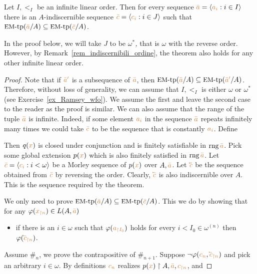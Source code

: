 \begin{void}\label{thm_EM}
  Let $I,<_I$ be an infinite linear order.
  Then for every sequence ${\color{brown}\bar a}=\langle{\color{brown}a_i}:i\in I\rangle$ there is an $A$-indiscernible sequence ${\color{brown}\bar c}=\langle{\color{brown}c_i}:i\in J\rangle$ such that $\mbox{{\small EM}-tp}({\color{brown}\bar a}/A)\subseteq\mbox{{\small EM}-tp}({\color{brown}\bar c}/A)$.
\end{void}

In the proof below, we will take $J$ to be \emph{$\omega^*$,} that is $\omega$ with the reverse order. 
However, by Remark~\ref{rem_indiscernibili_ordine}, the theorem also holds for any other infinite linear order.

\begin{proof}
  Note that if ${\color{brown}\bar a'}$ is a subsequence of ${\color{brown}\bar a}$, then $\mbox{{\small EM}-tp}({\color{brown}\bar a}/A)\subseteq\mbox{{\small EM}-tp}({\color{brown}\bar a'}/A)$.
  Therefore, without loss of generality, we can assume that $I,<_I$ is either $\omega$ or $\omega^*$ (see Exercise~\ref{ex_Ramsey_wfo}).
  We assume the first and leave the second case to the reader as the proof is similar.
  We can also assume that the range of the tuple ${\color{brown}\bar a}$ is infinite.
  Indeed, if some element ${\color{brown} a_i}$ in the sequence ${\color{brown}\bar a}$ repeats infinitely many times we could take ${\color{brown}\bar c}$ to be the sequence that is constantly ${\color{brown} a_i}$.
  Define


Then $q({\color{brown} x})$ is closed under conjunction and is finitely satisfiable in $\mathop{\rm rng} {\color{brown}\bar a}$. 
Pick some global extension $p({\color{brown} x})$ which is also finitely satisfied in $\mathop{\rm rng} {\color{brown}\bar a}$.
Let ${\color{brown}\bar c}=\langle{\color{brown}c_i}:i<\omega\rangle$ be a Morley sequence of $p({\color{brown} x})$ over $A,{\color{brown}\bar a}$.
Let ${\mr\cev{c}}$ be the sequence obtained from ${\color{brown}\bar c}$ by reversing the order.
Clearly, ${\mr\cev{c}}$ is also indiscernible over $A$.
This is the sequence required by the theorem.

We only need to prove $\mbox{{\small EM}-tp}({\color{brown}\bar a}/A)\subseteq\mbox{{\small EM}-tp}({\color{brown}\bar c}/A)$.
This we do by showing that for any $\varphi({\color{brown} x_{\restriction n}})\in L(A,{\color{brown}\bar a})$\nobreak
\begin{itemize}
  \item[$\#_n$] if there is an $i\in\omega$ such that $\varphi({\color{brown} a_{\restriction I_0}})$ holds for every $i<I_0\in\omega^{(n)}$ then $\phi({\mr\cev{c}_{\restriction n}})$.
\end{itemize}
Assume $\#_n$, we prove the contrapositive of $\#_{n+1}$.
Suppose $\neg\phi({\mr c_n},{\mr\cev{c}_{\restriction n}})$ and pick an arbitrary $i\in\omega$.
By definitions ${\color{brown} c_n}$ realizes $p({\color{brown} x})\restriction A,{\color{brown}\bar a},{\color{brown} c_{\restriction n}}$, and


\end{proof}
